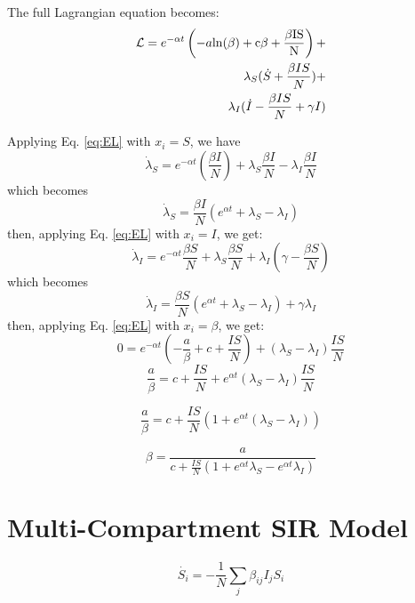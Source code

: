 \documentclass[11pt]{article} %
\begin{document}
 The full Lagrangian equation becomes:
\begin{equation}
\begin{split}
\mathcal{L} =e^{-\alpha t} \left(-a \rm {ln}({\beta})+c\beta+\frac{\beta IS}{N}\right) +\\
\lambda_S(\dot{S} +\frac{\beta IS}{N})+\\
\lambda_I(\dot{I}-\frac{\beta IS}{N}+\gamma I)
\end{split}
\end{equation}

Applying Eq. \ref{eq:EL} with $x_i = S$, we have 
\begin{equation}
\dot{\lambda}_S = e^{-\alpha t}(\frac{\beta I}{N})+\lambda_S \frac{\beta I}{N}-\lambda_I \frac{\beta I}{N}
\end{equation}
which becomes
\begin{equation}
\dot{\lambda}_S = \frac{\beta I}{N}\left( e^{\alpha t}+\lambda_S-\lambda_I \right)
\end{equation}
then, applying Eq. \ref{eq:EL} with $x_i = I$, we get:
\begin{equation}
\dot{\lambda}_I = e^{-\alpha t}\frac{\beta S}{N}+\lambda_S \frac{\beta S}{N}+\lambda_I(\gamma-\frac{\beta S}{N})
\end{equation}
which becomes
\begin{equation}
\dot{\lambda}_I = \frac{\beta S}{N}(e^{\alpha t}+\lambda_S-\lambda_I)+\gamma \lambda_I
\end{equation}
then, applying Eq. \ref{eq:EL} with $x_i = \beta$, we get:
\begin{equation}
0=e^{-\alpha t}(-\frac{a}{\beta}+c+\frac{IS}{N})+(\lambda_S-\lambda_I)\frac{IS}{N}
\end{equation}
\begin{equation}
\frac{a}{\beta} = c+\frac{IS}{N}+e^{\alpha t}(\lambda_S-\lambda_I)\frac{IS}{N}
\end{equation}

\begin{equation}
\frac{a}{\beta} = c+\frac{IS}{N}(1+e^{\alpha t}(\lambda_S-\lambda_I))
\end{equation}

\begin{equation}
\beta = \frac{a}{c+\frac{IS}{N}(1+e^{\alpha t}\lambda_S-e^{\alpha t}\lambda_I)}
\end{equation}

\section{Multi-Compartment SIR Model}
\begin{equation}
\dot{S_i} = -\frac{1}{N}\sum_j{\beta_{ij}I_jS_i}
\end{equation}
\end{document}
